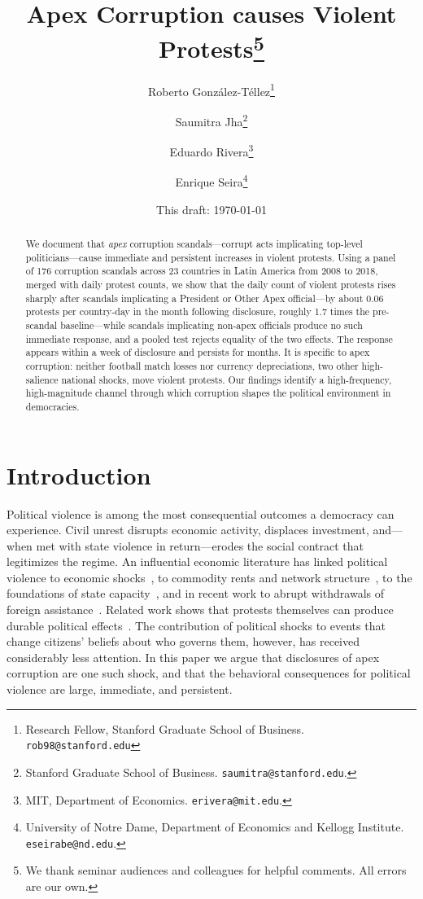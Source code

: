 \documentclass[11pt]{article}
\title{\bfseries\Large Apex Corruption causes Violent Protests\thanks{We thank seminar audiences and colleagues for helpful comments. All errors are our own.}}
\author{%
Roberto Gonz\'alez-T\'ellez\thanks{Research Fellow, Stanford Graduate School of Business. \texttt{rob98@stanford.edu}}  \and Saumitra Jha\thanks{Stanford Graduate School of Business. \texttt{saumitra@stanford.edu}.}
\and
Eduardo Rivera\thanks{MIT, Department of Economics. \texttt{erivera@mit.edu}.} \and
Enrique Seira\thanks{University of Notre Dame, Department of Economics and Kellogg Institute. \texttt{eseirabe@nd.edu}.}
%
}
\date{This draft: \today}
\begin{document}
\maketitle

\begin{abstract}
    \noindent We document that \textit{apex} corruption scandals---corrupt acts implicating top-level politicians---cause immediate and persistent increases in violent protests. Using a panel of 176 corruption scandals across 23 countries in Latin America from 2008 to 2018, merged with daily protest counts, we show that the daily count of violent protests rises sharply after scandals implicating a President or Other Apex official---by about 0.06 protests per country-day in the month following disclosure, roughly 1.7 times the pre-scandal baseline---while scandals implicating non-apex officials produce no such immediate response, and a pooled test rejects equality of the two effects. The response appears within a week of disclosure and persists for months. It is specific to apex corruption: neither football match losses nor currency depreciations, two other high-salience national shocks, move violent protests. Our findings identify a high-frequency, high-magnitude channel through which corruption shapes the political environment in democracies.
\end{abstract}


\bigskip

\clearpage
\section{Introduction}

Political violence is among the most consequential outcomes a democracy can experience. Civil unrest disrupts economic activity, displaces investment, and---when met with state violence in return---erodes the social contract that legitimizes the regime. An influential economic literature has linked political violence to economic shocks~\citep{miguel2004economic,mcguirk2020economic}, to commodity rents and network structure~\citep{koenig2017networks,dube2013commodity}, to the foundations of state capacity~\citep{besley2011logic}, and in recent work to abrupt withdrawals of foreign assistance~\citep{rohner2026aidingpeace}. Related work shows that protests themselves can produce durable political effects~\citep{madestam2013protests,bursztyn2021persistent}. The contribution of political shocks to events that change citizens' beliefs about who governs them, however, has received considerably less attention. In this paper we argue that disclosures of apex corruption are one such shock, and that the behavioral consequences for political violence are large, immediate, and persistent.
\end{document}
